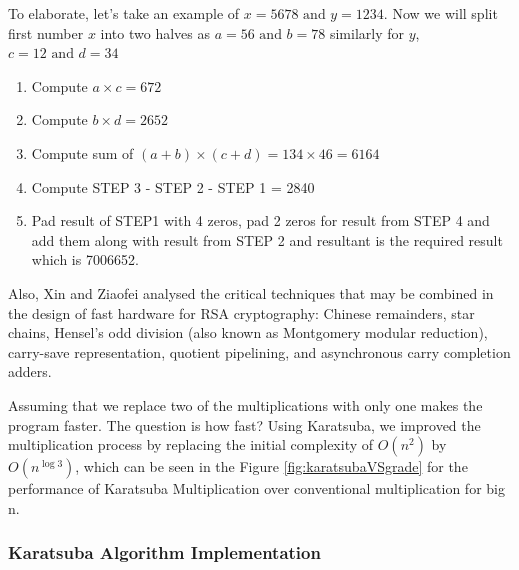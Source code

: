 \documentclass[12pt,journal,compsoc]{IEEEtran}
\begin{document}
To elaborate, let's take an example of $x = 5678 \text{ and } y = 1234$. Now we will split first number $x$ into two halves as $a=56 \text{ and }b=78$ similarly for $y$, $c=12 \text{ and } d=34$

\begin{enumerate}[ {STEP }1{:} ]
	\item Compute $a \times c = 672$
	\item Compute $b \times d = 2652$
	\item Compute sum of $(a + b)\times (c +d) = 134 \times 46 = 6164$
	\item Compute STEP 3 - STEP 2 - STEP 1 = 2840
	\item Pad result of STEP1 with 4 zeros, pad 2 zeros for result from STEP 4 and add them along with result from STEP 2 and resultant is the required result which is 7006652.
\end{enumerate}

Also, Xin  and Ziaofei\cite{378085} analysed the critical techniques that may be combined in the design of fast hardware for RSA cryptography: Chinese remainders, star chains, Hensel's odd division (also known as Montgomery modular reduction), carry-save representation, quotient pipelining, and asynchronous carry completion adders.

Assuming that we replace two of the multiplications with only one makes the program faster. The question is how fast? Using Karatsuba, we improved the multiplication process by replacing the initial complexity of $O(n^{2})$ by $O(n^{\log 3})$, which can be seen in the Figure \ref{fig:karatsubaVSgrade} for the performance of Karatsuba Multiplication over conventional multiplication for big n.


\subsubsection{\bf Karatsuba Algorithm Implementation}
\end{document}
